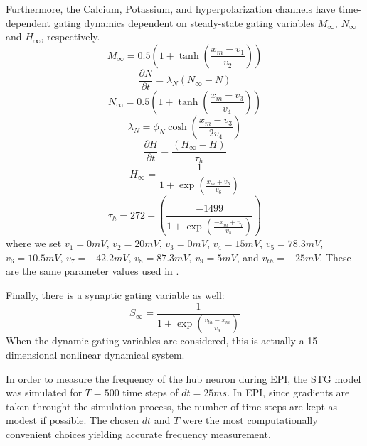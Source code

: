 \documentclass[11pt]{article}
\begin{document}
Furthermore, the Calcium, Potassium, and hyperpolarization channels have time-dependent gating dynamics dependent on steady-state gating variables $M_\infty$, $N_\infty$ and $H_\infty$, respectively.
\begin{equation}  M_{\infty} = 0.5 \left( 1 + \tanh \left( \frac{x_m - v_1}{v_2} \right) \right) \end{equation}
\begin{equation}  \frac{\partial N}{\partial t} = \lambda_N (N_\infty - N)  \end{equation}
\begin{equation}  N_\infty = 0.5 \left( 1 + \tanh \left( \frac{x_m - v_3}{v_4} \right) \right) \end{equation}
\begin{equation}  \lambda_N = \phi_N \cosh \left( \frac{x_m - v_3}{2 v_4} \right) \end{equation}
\begin{equation}  \frac{\partial H}{\partial t} = \frac{\left( H_\infty - H \right)}{\tau_h} \end{equation}
\begin{equation}  H_\infty = \frac{1}{1 + \exp \left( \frac{x_m + v_5}{v_6} \right)} \end{equation}
\begin{equation}  \tau_h = 272 - \left( \frac{-1499}{1 + \exp \left( \frac{-x_m + v_7}{v_8} \right)} \right) \end{equation}
where we set $v_1 = 0mV$, $v_2  = 20mV$, $v_3 = 0mV$, $v_4 = 15mV$, $v_5 = 78.3mV$,
$v_6 = 10.5mV$, $v_7 = -42.2mV$, $v_8 = 87.3mV$, $v_9 = 5mV$, and $v_{th} = -25mV$.  These are the same parameter values used in \cite{gutierrez2013multiple}.

Finally, there is a synaptic gating variable as well:
\begin{equation} S_\infty = \frac{1}{1 + \exp \left( \frac{v_{th} - x_m}{v_9} \right)} 
\end{equation}
When the dynamic gating variables are considered, this is actually a 15-dimensional nonlinear dynamical system.

In order to measure the frequency of the hub neuron during EPI, the STG model was simulated for $T = 500$ time steps of $dt = 25ms$.  In EPI, since gradients are taken throught the simulation process, the number of time steps are kept as modest if possible. The chosen $dt$ and $T$ were the most computationally convenient choices yielding accurate frequency measurement.
\end{document}
